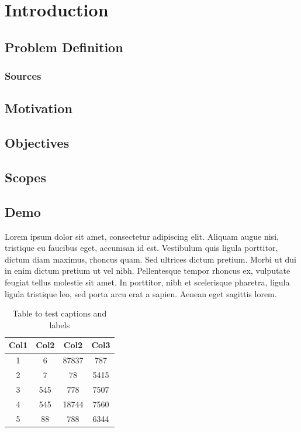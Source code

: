\chapter{Introduction}
\label{chap:Introduction}

\section{Problem Definition}
\label{sec:Problem Definition}

\subsection{Sources}
\label{sub:Sources}

\section{Motivation}
\label{sec:Motivation}

\section{Objectives}
\label{sec:Objectives}

\section{Scopes}
\label{sec:Scopes}


\section{Demo}
\label{sec:Demo}

Lorem ipsum dolor sit amet, consectetur adipiscing elit. Aliquam augue nisi,
tristique eu faucibus eget, accumsan id est. Vestibulum quis ligula porttitor,
dictum diam maximus, rhoncus quam. Sed ultrices dictum pretium. Morbi ut dui in
enim dictum pretium ut vel nibh. Pellentesque tempor rhoncus ex, vulputate
feugiat tellus molestie sit amet. In porttitor, nibh et scelerisque pharetra,
ligula ligula tristique leo, sed porta arcu erat a sapien. Aenean eget sagittis
lorem.

\begin{table}[h!]
    \centering
    \begin{tabular}{|c c c c|}
        \hline
        Col1 & Col2 & Col2 & Col3 \\
        \hline
        1 & 6 & 87837 & 787 \\
        2 & 7 & 78 & 5415 \\
        3 & 545 & 778 & 7507 \\
        4 & 545 & 18744 & 7560 \\
        5 & 88 & 788 & 6344 \\
        \hline
    \end{tabular}
    \caption{Table to test captions and labels}
    \label{table}
\end{table}

